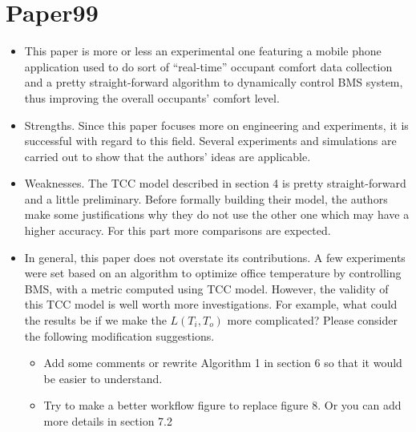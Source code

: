 \documentclass{article}
\begin{document}
 



\section{Paper99}
\label{sec:paper99}


\begin{itemize}
\item This paper is more or less an experimental one featuring a
  mobile phone application used to do sort of ``real-time'' occupant
  comfort data collection and a pretty straight-forward algorithm to
  dynamically control BMS system, thus improving the overall
  occupants' comfort level.
\item Strengths. Since this paper focuses more on engineering and
  experiments, it is successful with regard to this field. Several
  experiments and simulations are carried out to show that the
  authors' ideas are applicable. 
\item Weaknesses. The TCC model described in section 4 is pretty
  straight-forward and a little preliminary. Before formally building
  their model, the authors make some justifications why they do not
  use the other one which may have a higher accuracy. For this part
  more comparisons are expected.
\item In general, this paper does not overstate its contributions. A
  few experiments were set based on an algorithm to optimize office
  temperature by controlling BMS, with a metric computed using TCC
  model. However, the validity of this TCC model is well worth more
  investigations. For example, what could the results be if we make
  the $L(T_{i},T_{o})$ more complicated? Please consider the following
  modification suggestions.
  \begin{itemize}
  \item Add some comments or rewrite Algorithm 1 in section 6 so that
    it would be easier to understand.
  \item Try to make a better workflow figure to replace figure 8. Or
    you can add more details in section 7.2
  \end{itemize}
\end{itemize}
 
\end{document}
